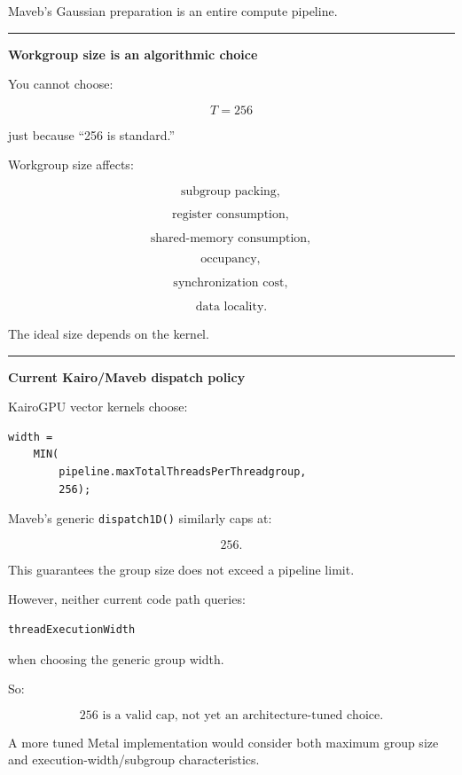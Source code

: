Maveb's Gaussian preparation is an entire compute pipeline.

\begin{center}\rule{0.5\linewidth}{0.5pt}\end{center}

\textbf{Workgroup size is an algorithmic choice}

You cannot choose:

\[
T=256
\]

just because ``256 is standard.''

Workgroup size affects:

\[
\text{subgroup packing},
\]

\[
\text{register consumption},
\]

\[
\text{shared-memory consumption},
\]

\[
\text{occupancy},
\]

\[
\text{synchronization cost},
\]

\[
\text{data locality}.
\]

The ideal size depends on the kernel.

\begin{center}\rule{0.5\linewidth}{0.5pt}\end{center}

\textbf{Current Kairo/Maveb dispatch policy}

KairoGPU vector kernels choose:

\protect{}\label{ozt45h}%
\begin{verbatim}
width =
    MIN(
        pipeline.maxTotalThreadsPerThreadgroup,
        256);
\end{verbatim}

Maveb's generic \texttt{dispatch1D()} similarly caps at:

\[
256.
\]

This guarantees the group size does not exceed a pipeline limit.

However, neither current code path queries:

\protect{}\label{p4wrmn}%
\begin{verbatim}
threadExecutionWidth
\end{verbatim}

when choosing the generic group width.

So:

\[
\boxed{
256\text{ is a valid cap, not yet an architecture-tuned choice}.
}
\]

A more tuned Metal implementation would consider both maximum group size and execution-width/subgroup characteristics.

